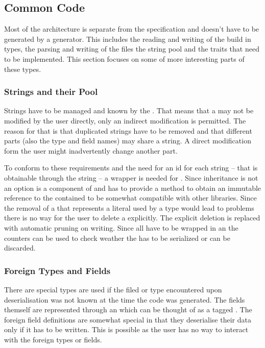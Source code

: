 \documentclass[thesis]{subfiles}
\begin{document}
  \subsection{Common Code}
    Most of the architecture is separate from the specification and doesn't have to be generated by a generator.
    This includes the reading and writing of the build in types, the parsing and writing of the files the string pool and the traits that need to be implemented.
    This section focuses on some of more interesting parts of these types.

    \subsubsection{Strings and their Pool}
      Strings have to be managed and known by the \StringPool.
      That means that a \String may not be modified by the user directly, only an indirect modification is permitted.
      The reason for that is that duplicated strings have to be removed and that different parts (also the type and field names) may share a string.
      A direct modification form the user might inadvertently change another part.

      To conform to these requirements and the need for an id for each string -- that is obtainable through the string -- a wrapper is needed for \String.
      Since inheritance is not an option \String is a component of \SkillString and \SkillString has to provide a method to obtain an immutable reference to the contained \String to be somewhat compatible with other libraries.
      Since the removal of a \SkillString that represents a literal used by a type would lead to problems there is no way for the user to delete a \SkillString explicitly.
      The explicit deletion is replaced with automatic pruning on writing.
      Since all \SkillString have to be wrapped in an \RcT the counters can be used to check weather the \SkillString has to be serialized or can be discarded.

    \subsubsection{Foreign Types and Fields}
      There are special types are used if the filed or type encountered upon deserialisation was not known at the time the code was generated.
      The fields themself are represented through an \enum which can be thought of as a tagged .
      The foreign field definitions are somewhat special in that they deserialise their data only if it has to be written.
      This is possible as the user has no way to interact with the foreign types or fields.
\end{document}
